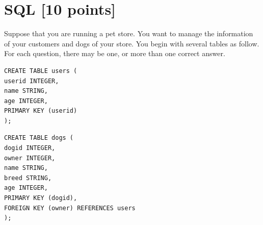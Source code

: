 \documentclass[10pt]{article}
\begin{document}


\newpage
\section{SQL \textbf{[10 points]}}
Suppose that you are running a pet store. You want to manage the information of your customers and dogs of your store.
You begin with several tables as follow. For each question, there may be one, or more than one correct answer.
\begin{verbatim}
CREATE TABLE users (
userid INTEGER,
name STRING,
age INTEGER,
PRIMARY KEY (userid)
);
\end{verbatim}

\begin{verbatim}
CREATE TABLE dogs (
dogid INTEGER,
owner INTEGER,
name STRING,
breed STRING,
age INTEGER,
PRIMARY KEY (dogid),
FOREIGN KEY (owner) REFERENCES users
);
\end{verbatim}
\end{document}
